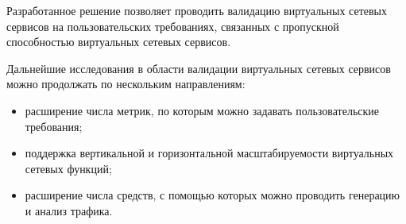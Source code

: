 \documentclass[oneside,final,14pt,a4paper]{extreport}
\begin{document}
Разработанное решение позволяет проводить валидацию виртуальных сетевых сервисов на пользовательских требованиях, связанных с пропускной способностью виртуальных сетевых сервисов.

Дальнейшие исследования в области валидации виртуальных сетевых сервисов можно продолжать по нескольким направлениям: 

\begin{itemize}
    \item расширение числа метрик, по которым можно задавать пользовательские требования;
    \item поддержка вертикальной и горизонтальной масштабируемости виртуальных сетевых функций;
    \item расширение числа средств, с помощью которых можно проводить генерацию и анализ трафика.
\end{itemize}
\end{document}
